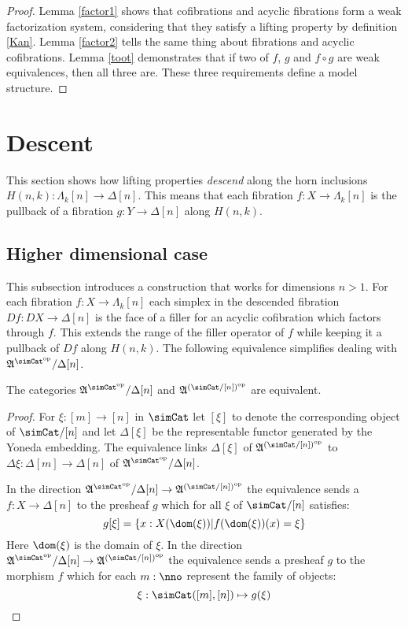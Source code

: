 \documentclass{tac}
\newcommand\hide[1]{}
\newcommand\set[1]{\left\{#1\right\}}
\newcommand\dual{^{\mathrm{op}}}
\newcommand\s{^{\simCat\dual}}
\newcommand\of{:}
\newcommand\simplex\Delta
\newcommand\horn\Lambda
\newcommand\ambient{\mathfrak A}
\begin{document}
\begin{proof}
Lemma \ref{factor1} shows that cofibrations and acyclic fibrations form a weak factorization system, considering that they satisfy a lifting property by definition \ref{Kan}. Lemma \ref{factor2} tells the same thing about fibrations and acyclic cofibrations. Lemma \ref{toot} demonstrates that if two of $f$, $g$ and $f\circ g$ are weak equivalences, then all three are. These three requirements define a model structure.
\end{proof}

\section{Descent} %
This section shows how lifting properties \emph{descend} along the horn inclusions $H(n,k)\of \horn_k[n]\to\simplex[n]$. This means that each fibration $f\of X\to\horn_k[n]$ is the pullback of a fibration $g\of Y\to\simplex[n]$ along $H(n,k)$.

\subsection{Higher dimensional case}
This subsection introduces a construction that works for dimensions $n>1$. For each fibration $f\of X\to \horn_k[n]$ each simplex in the descended fibration $Df\of DX\to \simplex[n]$ is the face of a filler for an acyclic cofibration which factors through $f$. This extends the range of the filler operator of $f$ while keeping it a pullback of $Df$ along $H(n,k)$. The following equivalence simplifies dealing with $\ambient\s/\simplex[n]$.

\hide{ this bit scares me. Has it actually gotten harder though? }
\begin{lemma} The categories $\ambient\s/\simplex[n]$ and $\ambient^{(\simCat/[n])\dual}$ are equivalent. \label{slice equivalence} \end{lemma}

\begin{proof} For $\xi\of[m]\to[n]$ in $\simCat$ let $[\xi]$ to denote the corresponding object of $\simCat/[n]$ and let $\simplex[\xi]$ be the representable functor generated by the Yoneda embedding. The equivalence links $\simplex[\xi]$ of $\ambient^{(\simCat/[n])\dual}$ to $\Delta\xi\of \simplex[m]\to \simplex[n]$ of $\ambient\s/\simplex[n]$.

In the direction $\ambient\s/\simplex[n]\to \ambient^{(\simCat/[n])\dual}$ the equivalence sends a $f\of X\to \simplex[n]$ to the presheaf $g$ which for all $\xi$ of $\simCat/[n]$ satisfies:
\[ g[\xi] = \set{ x\of X(\dom(\xi)) | f(\dom(\xi))(x)=\xi } \]
Here $\dom(\xi)$ is the domain of $\xi$.
In the direction $\ambient\s/\simplex[n]\to \ambient^{(\simCat/[n])\dual}$ the equivalence sends a presheaf $g$ to the morphism $f$ which for each $m\of\nno$ represent the family of objects:
\[ \xi\of\simCat([m],[n])\mapsto g(\xi) \]
\end{proof}
\end{document}

